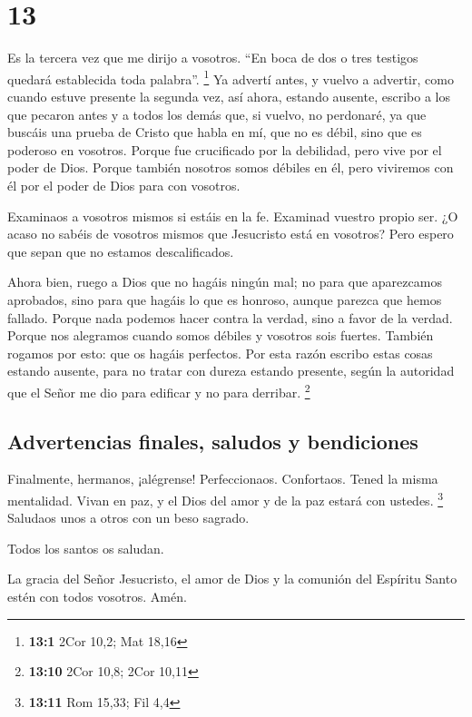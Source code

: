 \hypertarget{section-12}{%
\section{13}\label{section-12}}

 Es la tercera vez que me dirijo a vosotros. ``En boca de
dos o tres testigos quedará establecida toda palabra''. \footnote{\textbf{13:1}
  2Cor 10,2; Mat 18,16}  Ya advertí antes, y vuelvo a
advertir, como cuando estuve presente la segunda vez, así ahora, estando
ausente, escribo a los que pecaron antes y a todos los demás que, si
vuelvo, no perdonaré,  ya que buscáis una prueba de Cristo
que habla en mí, que no es débil, sino que es poderoso en vosotros.
 Porque fue crucificado por la debilidad, pero vive por el
poder de Dios. Porque también nosotros somos débiles en él, pero
viviremos con él por el poder de Dios para con vosotros.

 Examinaos a vosotros mismos si estáis en la fe. Examinad
vuestro propio ser. ¿O acaso no sabéis de vosotros mismos que Jesucristo
está en vosotros?  Pero espero que sepan que no estamos
descalificados.

 Ahora bien, ruego a Dios que no hagáis ningún mal; no
para que aparezcamos aprobados, sino para que hagáis lo que es honroso,
aunque parezca que hemos fallado.  Porque nada podemos
hacer contra la verdad, sino a favor de la verdad.  Porque
nos alegramos cuando somos débiles y vosotros sois fuertes. También
rogamos por esto: que os hagáis perfectos.  Por esta
razón escribo estas cosas estando ausente, para no tratar con dureza
estando presente, según la autoridad que el Señor me dio para edificar y
no para derribar. \footnote{\textbf{13:10} 2Cor 10,8; 2Cor 10,11}

\hypertarget{advertencias-finales-saludos-y-bendiciones}{%
\subsection{Advertencias finales, saludos y
bendiciones}\label{advertencias-finales-saludos-y-bendiciones}}

 Finalmente, hermanos, ¡alégrense! Perfeccionaos.
Confortaos. Tened la misma mentalidad. Vivan en paz, y el Dios del amor
y de la paz estará con ustedes. \footnote{\textbf{13:11} Rom 15,33; Fil
  4,4}  Saludaos unos a otros con un beso sagrado.

 Todos los santos os saludan.

 La gracia del Señor Jesucristo, el amor de Dios y la
comunión del Espíritu Santo estén con todos vosotros. Amén.
